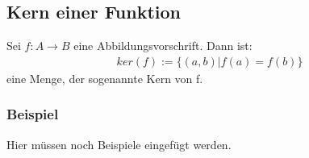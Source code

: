 \subsection{Kern einer Funktion}
Sei $f:{A}\longrightarrow{B}$ eine Abbildungsvorschrift.
Dann ist:
\begin{align*}
   ker(f) := \{(a,b) | f(a)=f(b)\}
\end{align*}
eine Menge, der sogenannte Kern von f.
\subsubsection{Beispiel}
Hier müssen noch Beispiele eingefügt werden.